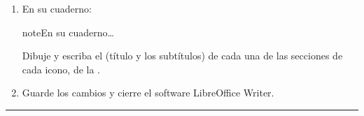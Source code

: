 \documentclass[letterpaper,10pt,spanish]{sphinxmanual}
\begin{document}
\begin{enumerate}
\item {} 
\sphinxAtStartPar
En su cuaderno:

\begin{sphinxadmonition}{note}{En su cuaderno…}

\sphinxAtStartPar
Dibuje y escriba el (título y los subtítulos) de cada una de las secciones de cada icono, de la .
\end{sphinxadmonition}

\item {} 
\sphinxAtStartPar
Guarde los cambios y cierre el software LibreOffice Writer.

\end{enumerate}


\bigskip\hrule\bigskip
\end{document}
